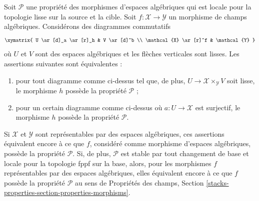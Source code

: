 \begin{lemma}
\label{lemma-local-source-target}
Soit $\mathcal{P}$ une propriété des morphismes d'espaces algébriques
qui est locale pour la topologie lisse sur la source et la cible.
Soit $f : \mathcal{X} \to \mathcal{Y}$ un morphisme de champs algébriques.
Considérons des diagrammes commutatifs
$$
\xymatrix{
U \ar[d]_a \ar[r]_h & V \ar[d]^b \\
\mathcal{X} \ar[r]^f & \mathcal{Y}
}
$$
où $U$ et $V$ sont des espaces algébriques et les flèches verticales
sont lisses. Les assertions suivantes sont équivalentes :
\begin{enumerate}
\item pour tout diagramme comme ci-dessus tel que, de plus,
$U \to \mathcal{X} \times_\mathcal{Y} V$ soit lisse,
le morphisme $h$ possède la propriété $\mathcal{P}$ ;
\item pour un certain diagramme comme ci-dessus où
$a : U \to \mathcal{X}$ est surjectif, le morphisme $h$
possède la propriété $\mathcal{P}$.
\end{enumerate}
Si $\mathcal{X}$ et $\mathcal{Y}$ sont représentables par des espaces
algébriques, ces assertions équivalent encore à ce que $f$, considéré
comme morphisme d'espaces algébriques, possède la propriété $\mathcal{P}$.
Si, de plus, $\mathcal{P}$ est stable par tout changement de base et
locale pour la topologie fppf sur la base, alors, pour les morphismes $f$
représentables par des espaces algébriques, elles équivalent encore à ce
que $f$ possède la propriété $\mathcal{P}$ au sens de Propriétés des champs,
Section \ref{stacks-properties-section-properties-morphisms}.
\end{lemma}

